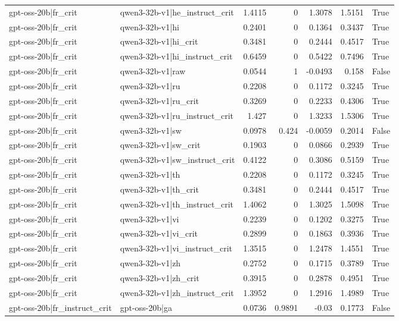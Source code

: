 \begin{table}
\begin{tabular}{l l r r r r l}
gpt-oss-20b|fr_crit & qwen3-32b-v1|he_instruct_crit & 1.4115 & 0 & 1.3078 & 1.5151 & True \\
gpt-oss-20b|fr_crit & qwen3-32b-v1|hi & 0.2401 & 0 & 0.1364 & 0.3437 & True \\
gpt-oss-20b|fr_crit & qwen3-32b-v1|hi_crit & 0.3481 & 0 & 0.2444 & 0.4517 & True \\
gpt-oss-20b|fr_crit & qwen3-32b-v1|hi_instruct_crit & 0.6459 & 0 & 0.5422 & 0.7496 & True \\
gpt-oss-20b|fr_crit & qwen3-32b-v1|raw & 0.0544 & 1 & -0.0493 & 0.158 & False \\
gpt-oss-20b|fr_crit & qwen3-32b-v1|ru & 0.2208 & 0 & 0.1172 & 0.3245 & True \\
gpt-oss-20b|fr_crit & qwen3-32b-v1|ru_crit & 0.3269 & 0 & 0.2233 & 0.4306 & True \\
gpt-oss-20b|fr_crit & qwen3-32b-v1|ru_instruct_crit & 1.427 & 0 & 1.3233 & 1.5306 & True \\
gpt-oss-20b|fr_crit & qwen3-32b-v1|sw & 0.0978 & 0.424 & -0.0059 & 0.2014 & False \\
gpt-oss-20b|fr_crit & qwen3-32b-v1|sw_crit & 0.1903 & 0 & 0.0866 & 0.2939 & True \\
gpt-oss-20b|fr_crit & qwen3-32b-v1|sw_instruct_crit & 0.4122 & 0 & 0.3086 & 0.5159 & True \\
gpt-oss-20b|fr_crit & qwen3-32b-v1|th & 0.2208 & 0 & 0.1172 & 0.3245 & True \\
gpt-oss-20b|fr_crit & qwen3-32b-v1|th_crit & 0.3481 & 0 & 0.2444 & 0.4517 & True \\
gpt-oss-20b|fr_crit & qwen3-32b-v1|th_instruct_crit & 1.4062 & 0 & 1.3025 & 1.5098 & True \\
gpt-oss-20b|fr_crit & qwen3-32b-v1|vi & 0.2239 & 0 & 0.1202 & 0.3275 & True \\
gpt-oss-20b|fr_crit & qwen3-32b-v1|vi_crit & 0.2899 & 0 & 0.1863 & 0.3936 & True \\
gpt-oss-20b|fr_crit & qwen3-32b-v1|vi_instruct_crit & 1.3515 & 0 & 1.2478 & 1.4551 & True \\
gpt-oss-20b|fr_crit & qwen3-32b-v1|zh & 0.2752 & 0 & 0.1715 & 0.3789 & True \\
gpt-oss-20b|fr_crit & qwen3-32b-v1|zh_crit & 0.3915 & 0 & 0.2878 & 0.4951 & True \\
gpt-oss-20b|fr_crit & qwen3-32b-v1|zh_instruct_crit & 1.3952 & 0 & 1.2916 & 1.4989 & True \\
gpt-oss-20b|fr_instruct_crit & gpt-oss-20b|ga & 0.0736 & 0.9891 & -0.03 & 0.1773 & False \\

\end{tabular}
\end{table}
